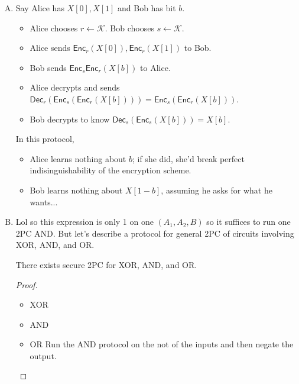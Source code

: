 \documentclass{scrartcl}
\begin{document}
\begin{sol}
    \begin{enumerate}[A.]
        \item 
        Say Alice has $X[0], X[1]$ and Bob has bit $b$. 
        \begin{itemize}
            \item Alice chooses $r \leftarrow \mathcal{K}$. Bob chooses $s \leftarrow \mathcal{K}$.
            \item Alice sends $\textsf{Enc}_r(X[0]), \textsf{Enc}_r(X[1])$ to Bob. 
            \item Bob sends $\textsf{Enc}_s \textsf{Enc}_r(X[b])$ to Alice.
            \item Alice decrypts and sends $\textsf{Dec}_r(\textsf{Enc}_s(\textsf{Enc}_r(X[b])))=\textsf{Enc}_s(\textsf{Enc}_r(X[b]))$.
            \item Bob decrypts to know $\textsf{Dec}_s(\textsf{Enc}_s(X[b]))=X[b]$.
        \end{itemize}

        In this protocol,
        \begin{itemize}
            \item Alice learns nothing about $b$; if she did, she'd break perfect indisinguishability of the encryption scheme.
            \item Bob learns nothing about $X[1-b]$, assuming he asks for what he wants...
        \end{itemize}

        \item 
        Lol so this expression is only 1 on one $(A_1, A_2, B)$ so it suffices to run one 2PC AND. But let's describe a protocol for general 2PC of circuits involving XOR, AND, and OR.

        \begin{claim*}
            There exists secure 2PC for XOR, AND, and OR.
        \end{claim*}
        \begin{proof}
            \mbox{}
            \begin{itemize}
                \item XOR

                \item AND

                \item OR
                Run the AND protocol on the not of the inputs and then negate the output.
            \end{itemize}
        \end{proof}


\end{enumerate}
\end{sol}
\end{document}
